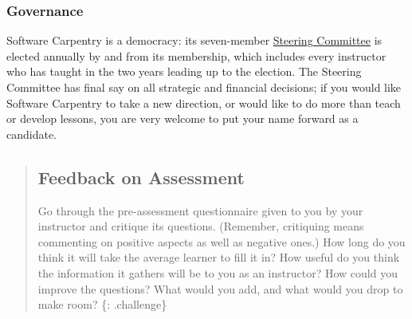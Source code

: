 \subsubsection{Governance}\label{governance}

Software Carpentry is a democracy: its seven-member
\href{\{\{\%20site.swc\_site\%20\}\}/scf/}{Steering Committee} is elected
annually by and from its membership, which includes every instructor who
has taught in the two years leading up to the election. The Steering
Committee has final say on all strategic and financial decisions; if you
would like Software Carpentry to take a new direction, or would like to
do more than teach or develop lessons, you are very welcome to put your
name forward as a candidate.

\begin{quote}
\subsection{Feedback on Assessment}\label{feedback-on-assessment}

Go through the pre-assessment questionnaire given to you by your
instructor and critique its questions. (Remember, critiquing means
commenting on positive aspects as well as negative ones.) How long do
you think it will take the average learner to fill it in? How useful do
you think the information it gathers will be to you as an instructor?
How could you improve the questions? What would you add, and what would
you drop to make room? \{: .challenge\}
\end{quote}
